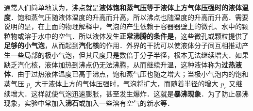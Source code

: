 通常人们简单地认为，沸点就是\textbf{液体饱和蒸气压等于液体上方气体压强时的液体温度}．饱和蒸气压随液体温度的升高而升高，所以沸点也随温度的升高而升高．需要说明的是，在上面的物理解释中，气泡的产生依赖于容器器壁上的微孔、水中的颗粒物或溶于水中的空气．所以液体发生\textbf{正常沸腾的条件是}，这些微孔或颗粒提供了\textbf{足够的小气泡}，从而起到\textbf{汽化核}的作用．外界的干扰可以使液体分子间互相推动产生一些局部的极小气泡，但其尺度只是数倍于分子半径，根本无法继续增大．如果缺乏汽化核，液体加热到沸点仍无法沸腾，从而继续升温，这种液体称为\textbf{过热液体}．由于过热液体温度已高于沸点，饱和蒸气压也随之增大；当极小气泡内的饱和蒸气压 $p_r$ 大于液体上方的气体压强时，气泡将扩大，而随着半径的增大 $p_r$ 又继续增大．这样就使气泡迅速膨胀，甚至发生爆炸．这就是\textbf{暴沸现象}．为了防止暴沸现象，实验中常加入\textbf{沸石}或加入一些溶有空气的新水等．